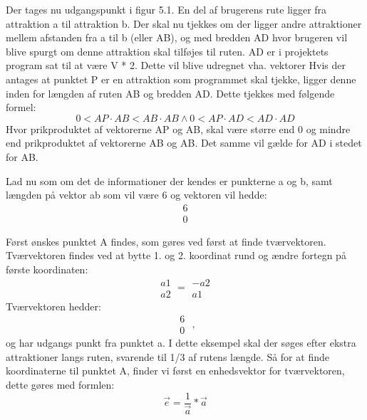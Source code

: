 Der tages nu udgangspunkt i figur 5.1. En del af brugerens rute ligger fra attraktion a til attraktion b. Der skal nu tjekkes om der ligger andre attraktioner mellem afstanden fra a til b (eller AB), og med bredden AD hvor brugeren vil blive spurgt om denne attraktion skal tilføjes til ruten. AD er i projektets program sat til at være V * 2. Dette vil blive udregnet vha. vektorer 
Hvis der antages at punktet P er en attraktion som programmet skal tjekke, ligger denne inden for længden af ruten AB og bredden AD. Dette tjekkes med følgende formel:
\[0 < AP \cdot AB < AB \cdot AB \wedge 0 < AP \cdot AD < AD \cdot AD \]
Hvor prikproduktet af vektorerne AP og AB, skal være større end 0 og mindre end prikproduktet af vektorerne AB og AB. Det samme vil gælde for AD i stedet for AB.

Lad nu som om det de informationer der kendes er punkterne a og b, samt længden på vektor ab som vil være 6 og vektoren vil hedde:
\[ \begin{matrix} 6 \\ 0 \end{matrix} \]

Først ønskes punktet A findes, som gøres ved først at finde tværvektoren. Tværvektoren findes ved at bytte 1. og 2. koordinat rund og ændre fortegn på første koordinaten:
\[ \begin{matrix} a1 \\ a2 \end{matrix} = \begin{matrix} -a2 \\ a1 \end{matrix} \]
Tværvektoren hedder: 
\[ \begin{matrix} 6 \\ 0 \end{matrix} \text{ ,} \]
og har udgangs punkt fra punktet a. \newline
I dette eksempel skal der søges efter ekstra attraktioner langs ruten, svarende til 1/3 af rutens længde. Så for at finde koordinaterne til punktet A, finder vi først en enhedsvektor for tværvektoren, dette gøres med formlen:
\[ \overrightarrow{e} = \frac{1}{\overrightarrow{a}}*\overrightarrow{a} \] 

